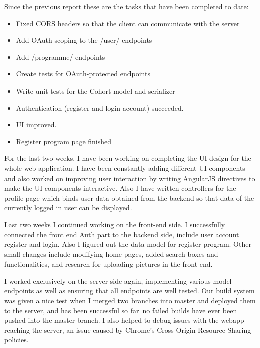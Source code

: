 \documentclass[11pt]{report}
\begin{document}
\bigskip
{}
\smallskip

\noindent
Since the previous report these are the tasks that have been completed to date:
\begin{itemize}
    \item Fixed CORS headers so that the client can communicate with the server
    \item Add OAuth scoping to the /user/ endpoints
    \item Add /programme/ endpoints
    \item Create tests for OAuth-protected endpoints
    \item Write unit tests for the Cohort model and serializer
    \item Authentication (register and login account) succeeded.
    \item UI improved.
    \item Register program page finished
\end{itemize}

\bigskip
{}
\smallskip

\noindent
For the last two weeks, I have been working on completing the UI design for the
whole web application. I have been constantly adding different UI components and
also worked on improving user interaction by writing AngularJS directives to
make the UI components interactive. Also I have written controllers for the
profile page which binds user data obtained from the backend so that data of the
currently logged in user can be displayed.

\bigskip
{}
\smallskip

\noindent
Last two weeks I continued working on the front-end side. I successfully
connected the front end Auth part to the backend side, include user account
register and login. Also I figured out the data model for register program.
Other small changes include modifying home pages, added search boxes and
functionalities, and research for uploading pictures in the front-end.

\bigskip
{}
\smallskip

\noindent
I worked exclusively on the server side again, implementing various model
endpoints as well as ensuring that all endpoints are well tested. Our build
system was given a nice test when I merged two branches into master and deployed
them to the server, and has been successful so far\textemdash~no failed builds have ever
been pushed into the master branch. I also helped to debug issues with the
webapp reaching the server, an issue caused by Chrome’s Cross-Origin Resource
Sharing policies.
\end{document}
